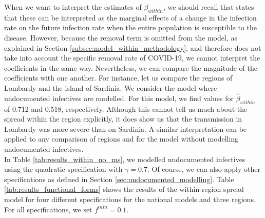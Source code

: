 \documentclass[12pt]{article}
\begin{document}
    When we want to interpret the estimates of $\beta_{within}$, we should recall that \textcite{adda2016economic} states that these can be interpreted as the marginal effects of a change in the infection rate on the future infection rate when the entire population is susceptible to the disease. However, because the removal term is omitted from the model, as explained in Section \ref{subsec:model_within_methodology}, and therefore does not take into account the specific removal rate of COVID-19, we cannot interpret the coefficients in the same way. Nevertheless, we can compare the magnitude of the coefficients with one another. For instance, let us compare the regions of Lombardy and the island of Sardinia. We consider the model where undocumented infectives are modelled. For this model, we find values for $\widehat{\beta}_{within}$ of 0.712 and 0.518, respectively. Although this cannot tell us much about the spread within the region explicitly, it does show us that the transmission in Lombardy was more severe than on Sardinia. A similar interpretation can be applied to any comparison of regions and for the model without modelling undocumented infectives. \\
	
	In Table \ref{tab:results_within_no_ms}, we modelled undocumented infectives using the quadratic specification with $\gamma = 0.7$. Of course, we can also apply other specifications as defined in Section \ref{sec:undocumented_modelling}. Table \ref{tab:results_functional_forms} shows the results of the within-region spread model for four different specifications for the national models and three regions. For all specifications, we set $f^{min} = 0.1$.
	
\end{document}
